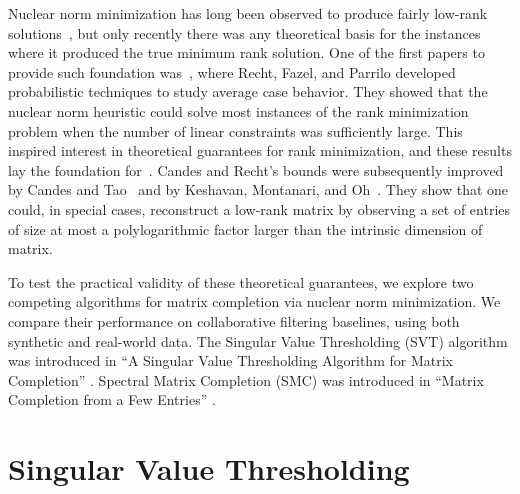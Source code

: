 \documentclass{article} %
\begin{document}
Nuclear norm minimization has long been observed to produce fairly
low-rank solutions~\cite{r11, r12, r26}, but only recently there was
any theoretical basis for the instances where it produced the true
minimum rank solution. One of the first papers to provide such
foundation was~\cite{r24}, where Recht, Fazel, and Parrilo developed
probabilistic techniques to study average case behavior. They showed
that the nuclear norm heuristic could solve most instances of the rank
minimization problem when the number of linear constraints was
sufficiently large. This inspired interest in theoretical guarantees
for rank minimization, and these results lay the foundation
for~\cite{r4}. Candes and Recht’s bounds were subsequently improved by
Candes and Tao~\cite{r7} and by Keshavan, Montanari, and
Oh~\cite{keshavan2010matrix}. They show that one could, in special
cases, reconstruct a low-rank matrix by observing a set of entries of
size at most a polylogarithmic factor larger than the intrinsic
dimension of matrix.

To test the practical validity of these theoretical guarantees, we
explore two competing algorithms for matrix completion via nuclear
norm minimization. We compare their performance on collaborative
filtering baselines, using both synthetic and real-world data. The
Singular Value Thresholding (SVT) algorithm was introduced in ``A
Singular Value Thresholding Algorithm for Matrix Completion''
\cite{cai2010singular}. Spectral Matrix Completion (SMC) was
introduced in ``Matrix Completion from a Few Entries''
\cite{keshavan2010matrix}.




\section{Singular Value Thresholding}
\end{document}
